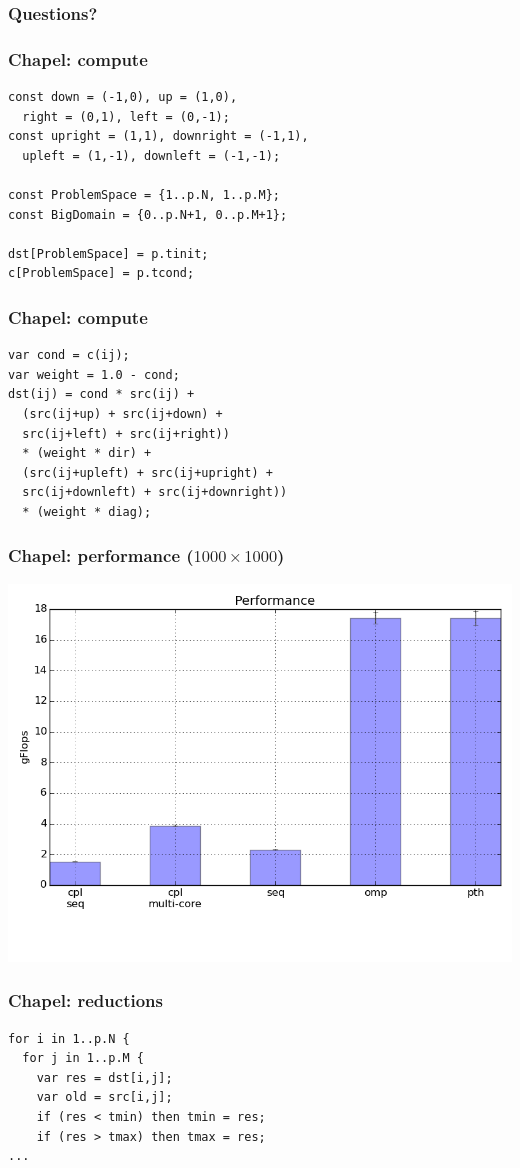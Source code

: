 \documentclass{beamer}
\begin{document}
\begin{frame}
 \frametitle{Questions?}
\end{frame}

\begin{frame}[fragile]
 \frametitle{Chapel: compute}
\begin{verbatim}
const down = (-1,0), up = (1,0),
  right = (0,1), left = (0,-1);
const upright = (1,1), downright = (-1,1),
  upleft = (1,-1), downleft = (-1,-1);

const ProblemSpace = {1..p.N, 1..p.M};
const BigDomain = {0..p.N+1, 0..p.M+1};

dst[ProblemSpace] = p.tinit;
c[ProblemSpace] = p.tcond;
\end{verbatim}
\end{frame}

\begin{frame}[fragile]
 \frametitle{Chapel: compute}
\begin{verbatim}
var cond = c(ij);
var weight = 1.0 - cond;
dst(ij) = cond * src(ij) +
  (src(ij+up) + src(ij+down) +
  src(ij+left) + src(ij+right))
  * (weight * dir) +
  (src(ij+upleft) + src(ij+upright) +
  src(ij+downleft) + src(ij+downright))
  * (weight * diag);
\end{verbatim}
\end{frame}

\begin{frame}
 \frametitle{Chapel: performance ($1000 \times 1000$)}
 \includegraphics[width=\textwidth]{../cpl/report/per_no_reductions.png}
\end{frame}

\begin{frame}[fragile]
 \frametitle{Chapel: reductions}
\begin{verbatim}
for i in 1..p.N {
  for j in 1..p.M {
    var res = dst[i,j];
    var old = src[i,j];
    if (res < tmin) then tmin = res;
    if (res > tmax) then tmax = res;
...
\end{verbatim}
\end{frame}
\end{document}
